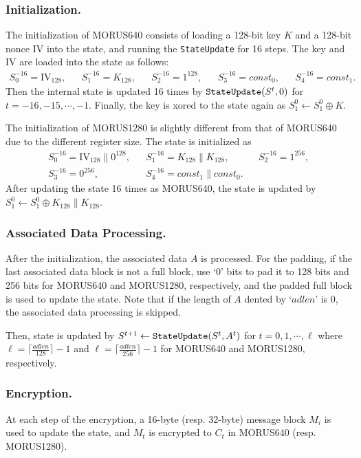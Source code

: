 \documentclass{llncs}
\newcommand{\cipher}[1]{\textsf{#1}}
\begin{document}
\subsubsection{Initialization.}
The initialization of \cipher{MORUS640} consists of loading a 128-bit key $K$ and a 128-bit nonce IV into the state, and running the {\tt StateUpdate} for 16 steps. The key and IV are loaded into the state as follows:
\begin{align*}
S^{-16}_0 = \textrm{IV}_{128}, &&
S^{-16}_1 = K_{128}, &&
S^{-16}_2 = 1^{128}, &&
S^{-16}_3 = const_0, &&
S^{-16}_4 = const_1.
\end{align*}
Then the internal state is updated 16 times by  ${\tt StateUpdate}(S^t,0)$ for $t=-16,-15,\cdots,-1$. Finally, the key is xored to the state again as $S^0_1 \leftarrow S^0_1 \oplus K$.

The initialization of \cipher{MORUS1280} is slightly different from that of \cipher{MORUS640} due to the different register size. The state is initialized as
\begin{align*}
S^{-16}_0 = \textrm{IV}_{128} \| 0^{128}, &&
S^{-16}_1 = K_{128}\|K_{128}, &&
S^{-16}_2 = 1^{256}, \\
S^{-16}_3 = 0^{256}, &&
S^{-16}_4 = const_1\|const_0.
\end{align*}
After updating the state 16 times as \cipher{MORUS640}, the state is updated by $S^0_1 \leftarrow S^0_1 \oplus K_{128}\|K_{128}$.


\subsubsection{Associated Data Processing.}
After the initialization, the associated data $A$ is processed. For the padding, if the last associated data block is not a full block, use `0' bits to pad it to 128 bits and 256 bits for \cipher{MORUS640} and \cipher{MORUS1280}, respectively, and the padded full block is used to update the state. Note that if the length of $A$ dented by `$adlen$' is 0, the associated data processing is skipped.

Then, state is updated by $S^{t+1} \leftarrow {\tt StateUpdate}(S^t, A^t)$ for $t=0,1,\cdots,\ell$ where $\ell = \lceil \frac{adlen}{128} \rceil -1$ and $\ell = \lceil \frac{adlen}{256} \rceil -1$ for \cipher{MORUS640} and \cipher{MORUS1280}, respectively.

\subsubsection{Encryption.}
At each step of the encryption, a 16-byte (resp. 32-byte) message block $M_i$ is used to update the state, and $M_t$ is encrypted to $C_t$ in \cipher{MORUS640} (resp. \cipher{MORUS1280}).
\end{document}
